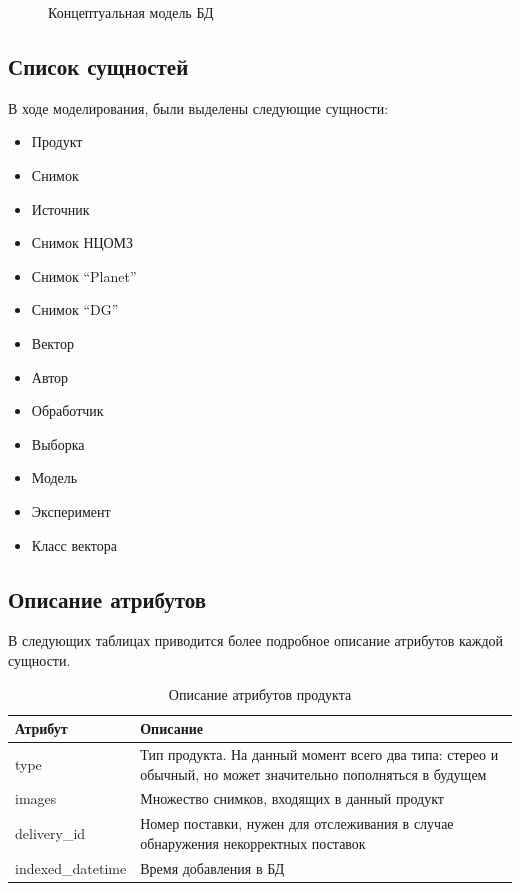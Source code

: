 \documentclass[a4paper]{article}
\begin{document}
\begin{figure}[h]
	\centering
	
	\caption{Концептуальная модель БД}
\end{figure}

\subsection{Список сущностей}
В ходе моделирования, были выделены следующие сущности:
\begin{itemize}
	\item Продукт
	\item Снимок
	\item Источник
	\item Снимок НЦОМЗ
	\item Снимок ``Planet''
	\item Снимок ``DG''
	\item Вектор
	\item Автор
	\item Обработчик
	\item Выборка
	\item Модель
	\item Эксперимент
	\item Класс вектора
\end{itemize}

\subsection{Описание атрибутов}
\label{attributes_definitions}
В следующих таблицах приводится более подробное описание атрибутов каждой сущности.

\begin{table}[h]
	\begin{tabular}{|C{0.20\textwidth}|p{0.75\textwidth}|}
		\hline
		Атрибут & \centering\arraybackslash Описание \\
		\hline
		type & Тип продукта. На данный момент всего два типа: стерео и обычный, но может значительно пополняться в будущем \\
		\hline
		images & Множество снимков, входящих в данный продукт \\
		\hline
		delivery\_id & Номер поставки, нужен для отслеживания в случае обнаружения некорректных поставок \\
		\hline
		indexed\_datetime & Время добавления в БД \\
		\hline
	\end{tabular}
	\caption{Описание атрибутов продукта}
\end{table}
\end{document}
